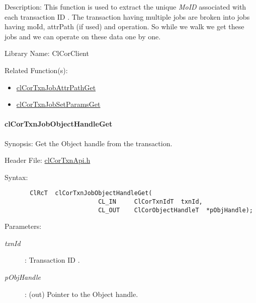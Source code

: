 \begin{Desc}
\item[Description:]This function is used to extract the unique {\em Mo\-ID\/} associated with each transaction ID . The transaction having multiple jobs are broken into jobs having mo\-Id, attr\-Path (if used) and operation. So while we walk we get these jobs and we can operate on these data one by one.\end{Desc}
\begin{Desc}
\item[Library Name:]Cl\-Cor\-Client\end{Desc}
\begin{Desc}
\item[Related Function(s):]\begin{itemize}
\item \hyperlink{group__group13}{cl\-Cor\-Txn\-Job\-Attr\-Path\-Get} \item \hyperlink{group__group13}{cl\-Cor\-Txn\-Job\-Set\-Params\-Get} \end{itemize}
\end{Desc}
\hypertarget{pagecor511}{}\paragraph{cl\-Cor\-Txn\-Job\-Object\-Handle\-Get}\label{pagecor511}
\begin{Desc}
\item[Synopsis:]Get the Object handle from the transaction.\end{Desc}
\begin{Desc}
\item[Header File:]\hyperlink{cl_cor_txn_api_8h}{cl\-Cor\-Txn\-Api.h}\end{Desc}
\begin{Desc}
\item[Syntax:]

\footnotesize\begin{verbatim}       ClRcT  clCorTxnJobObjectHandleGet(
                          CL_IN     ClCorTxnIdT  txnId,
                          CL_OUT    ClCorObjectHandleT  *pObjHandle);
\end{verbatim}
\normalsize
\end{Desc}
\begin{Desc}
\item[Parameters:]
\begin{description}
\item[{\em txn\-Id}]: Transaction ID . \item[{\em p\-Obj\-Handle}]: (out) Pointer to the Object handle.\end{description}
\end{Desc}
